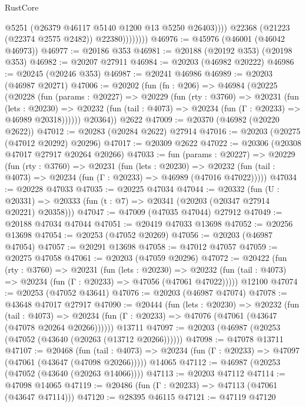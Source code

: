 \begin{lexlean}{RustCore}
\begin{coremodule}
                          @5251
                          (@26379 @46117 @5140 @1200 @13 @5250 @26403))))
                    @22368
                    (@21223 (@22374 @2575 @2482))
                    @22380))))))))
@46976 := @45976 (@46001 (@46042 @46973))
@46977 := @20186 @353
@46981 := @20188 (@20192 @353) (@20198 @353)
@46982 := @20207 @27911
@46984 := @20203 (@46982 @20222)
@46986 := @20245 (@20246 @353)
@46987 := @20241 @46986
@46989 := @20203 (@46987 @20271)
@47006 := @20202
    (fun (fn : @206) =>
    @46984
      (@20225
        (@20228
          (fun (params : @20227) =>
          @20229
            (fun (rty : @3760) =>
            @20231
              (fun (lets : @20230) =>
              @20232 (fun (tail : @4073) => @20234 (fun (Γ : @20233) => @46989 @20318))))))
        @20364))
    @2622
@47009 := @20370 (@46982 (@20220 @2622))
@47012 := @20283 (@20284 @2622) @27914
@47016 := @20203 (@20275 (@47012 @20292) @20296)
@47017 := @20309 @2622
@47022 := @20306 (@20308 @47017 @27917 @20264 @20266)
@47033 := fun (params : @20227) =>
  @20229
    (fun (rty : @3760) =>
    @20231
      (fun (lets : @20230) =>
      @20232 (fun (tail : @4073) => @20234 (fun (Γ : @20233) => @46989 (@47016 @47022)))))
@47034 := @20228 @47033
@47035 := @20225 @47034
@47044 := @20332
    (fun (U : @20331) => @20333 (fun (t : @7) => @20341 (@20203 (@20347 @27914 @20221) @20358)))
@47047 := @47009 (@47035 @47044) @27912
@47049 := @20188 @47034 @47044
@47051 := @20419 @47033 @13698
@47052 := @20256 @13698
@47054 := @20253 (@47052 @20269)
@47056 := @20203 (@46987 @47054)
@47057 := @20291 @13698
@47058 := @47012 @47057
@47059 := @20275 @47058
@47061 := @20203 (@47059 @20296)
@47072 := @20422
    (fun (rty : @3760) =>
    @20231
      (fun (lets : @20230) =>
      @20232 (fun (tail : @4073) => @20234 (fun (Γ : @20233) => @47056 (@47061 @47022)))))
    @12100
@47074 := @20253 (@47052 @43641)
@47076 := @20203 (@46987 @47074)
@47078 := @43648 @47017 @27917
@47090 := @20444
    (fun (lets : @20230) =>
    @20232
      (fun (tail : @4073) =>
      @20234 (fun (Γ : @20233) => @47076 (@47061 (@43647 (@47078 @20264 @20266))))))
    @13711
@47097 := @20203 (@46987 (@20253 (@47052 (@43640 (@20263 (@13712 @20266))))))
@47098 := @47078 @13711
@47107 := @20468
    (fun (tail : @4073) => @20234 (fun (Γ : @20233) => @47097 (@47061 (@43647 (@47098 @20266)))))
    @14065
@47112 := @46987 (@20253 (@47052 (@43640 (@20263 @14066))))
@47113 := @20203 @47112
@47114 := @47098 @14065
@47119 := @20486 (fun (Γ : @20233) => @47113 (@47061 (@43647 @47114)))
@47120 := @28395 @46115
@47121 := @47119 @47120

\end{coremodule}
\end{lexlean}
